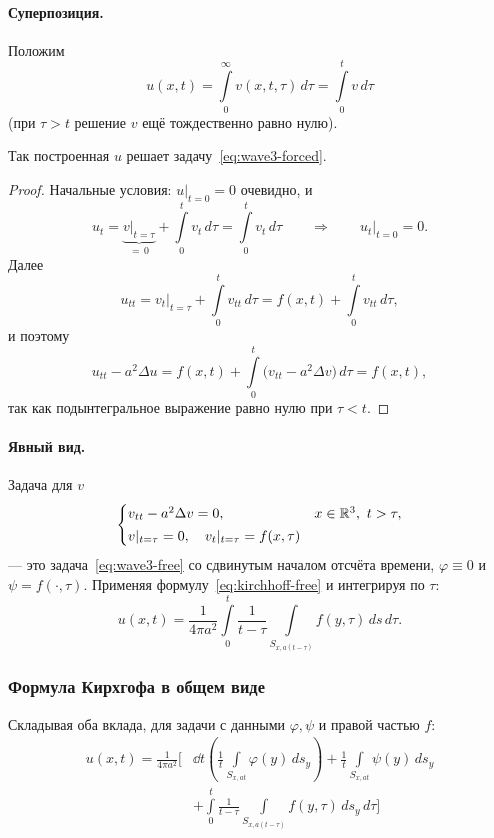 \paragraph{Суперпозиция.} Положим
\[
  u(x,t) = \int\limits_0^{\infty} v(x,t,\tau)\, d\tau
         = \int\limits_0^{t} v\, d\tau
\]
(при $\tau > t$ решение $v$ ещё тождественно равно нулю).

\begin{proposition}
Так построенная $u$ решает задачу~\eqref{eq:wave3-forced}.
\end{proposition}

\begin{proof}
Начальные условия: $u|_{t=0} = 0$ очевидно, и
\[
  u_t = \underbrace{v\big|_{t=\tau}}_{=\,0} + \int\limits_0^t v_t\, d\tau
      = \int\limits_0^t v_t\, d\tau
  \qquad\Longrightarrow\qquad u_t|_{t=0} = 0 .
\]
Далее
\[
  u_{tt} = v_t\big|_{t=\tau} + \int\limits_0^t v_{tt}\, d\tau
         = f(x,t) + \int\limits_0^t v_{tt}\, d\tau ,
\]
и поэтому
\[
  u_{tt} - a^2 \Delta u
  = f(x,t) + \int\limits_0^t \big(v_{tt} - a^2 \Delta v\big)\, d\tau
  = f(x,t) ,
\]
так как подынтегральное выражение равно нулю при $\tau < t$.
\end{proof}

\paragraph{Явный вид.} Задача для $v$
\[
  \begin{cases}
    v_{tt} - a^2 \Delta v = 0, & x \in \mathbb{R}^3,\ t > \tau, \\[2pt]
    v|_{t=\tau} = 0, \quad v_t|_{t=\tau} = f(x,\tau)
  \end{cases}
\]
— это задача~\eqref{eq:wave3-free} со сдвинутым началом отсчёта времени,
$\varphi \equiv 0$ и $\psi = f(\cdot,\tau)$. Применяя
формулу~\eqref{eq:kirchhoff-free} и интегрируя по $\tau$:
\[
  u(x,t) = \frac{1}{4\pi a^2} \int\limits_0^{t} \frac{1}{t-\tau}
  \int\limits_{S_{x,a(t-\tau)}} f(y,\tau)\, ds\, d\tau .
\]

\subsubsection*{Формула Кирхгофа в общем виде}

Складывая оба вклада, для задачи с данными $\varphi, \psi$ и правой частью $f$:
\[
  \boxed{
  \begin{aligned}
    u(x,t) = \frac{1}{4\pi a^2}\Bigg[ &
      \dd{}{t}\left(\frac1t \int\limits_{S_{x,at}} \varphi(y)\, ds_y\right)
      + \frac1t \int\limits_{S_{x,at}} \psi(y)\, ds_y \\[4pt]
    & + \int\limits_0^{t} \frac{1}{t-\tau}
      \int\limits_{S_{x,a(t-\tau)}} f(y,\tau)\, ds_y\, d\tau
    \Bigg]
  \end{aligned}}
\]

